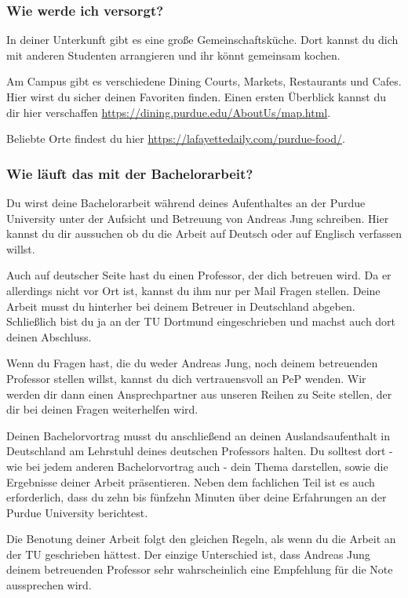 \documentclass[
  paper=a4,
  fontsize=12pt,
  DIV=16,
  headheight=52pt,
  footheight=45pt,
  headinclude,
  parskip=full,
]{scrartcl}
\begin{document}
\subsubsection*{Wie werde ich versorgt?}
In deiner Unterkunft gibt es eine große Gemeinschaftsküche.
Dort kannst du dich mit anderen Studenten arrangieren und ihr könnt gemeinsam
kochen.

Am Campus gibt es verschiedene Dining Courts, Markets, Restaurants und Cafes.
Hier wirst du sicher deinen Favoriten finden.
Einen ersten Überblick kannst du dir hier verschaffen
\url{https://dining.purdue.edu/AboutUs/map.html}.

Beliebte Orte findest du hier \url{https://lafayettedaily.com/purdue-food/}.

\subsubsection*{Wie läuft das mit der Bachelorarbeit?}
Du wirst deine Bachelorarbeit während deines Aufenthaltes an der Purdue
University unter der Aufsicht und Betreuung von Andreas Jung schreiben.
Hier kannst du dir aussuchen ob du die Arbeit auf Deutsch oder auf Englisch
verfassen willst.

Auch auf deutscher Seite hast du einen Professor, der dich betreuen wird.
Da er allerdings nicht vor Ort ist, kannst du ihm nur per Mail Fragen stellen.
Deine Arbeit musst du hinterher bei deinem Betreuer in Deutschland abgeben.
Schließlich bist du ja an der TU Dortmund eingeschrieben und machst auch dort
deinen Abschluss.

Wenn du Fragen hast, die du weder Andreas Jung, noch deinem betreuenden Professor
stellen willst, kannst du dich vertrauensvoll an PeP wenden.
Wir werden dir dann einen Ansprechpartner aus unseren Reihen zu Seite stellen,
der dir bei deinen Fragen weiterhelfen wird.

Deinen Bachelorvortrag musst du anschließend an deinen Auslandsaufenthalt in
Deutschland am Lehrstuhl deines deutschen Professors halten.
Du solltest dort - wie bei jedem anderen Bachelorvortrag auch - dein Thema
darstellen, sowie die Ergebnisse deiner Arbeit präsentieren.
Neben dem fachlichen Teil ist es auch erforderlich, dass du zehn bis fünfzehn
Minuten über deine Erfahrungen an der Purdue University berichtest.

Die Benotung deiner Arbeit folgt den gleichen Regeln, als wenn du die Arbeit an
der TU geschrieben hättest.
Der einzige Unterschied ist, dass Andreas Jung deinem betreuenden Professor
sehr wahrscheinlich eine Empfehlung für die Note aussprechen wird.
\end{document}
